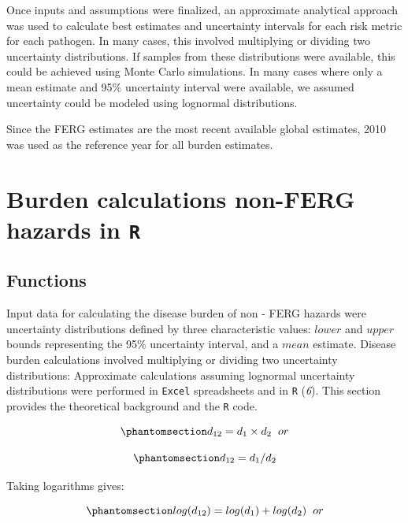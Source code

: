 \documentclass[
  letterpaper,
  DIV=11,
  numbers=noendperiod]{scrartcl}
\begin{document}
Once inputs and assumptions were finalized, an approximate analytical
approach was used to calculate best estimates and uncertainty intervals
for each risk metric for each pathogen. In many cases, this involved
multiplying or dividing two uncertainty distributions. If samples from
these distributions were available, this could be achieved using Monte
Carlo simulations. In many cases where only a mean estimate and 95\%
uncertainty interval were available, we assumed uncertainty could be
modeled using lognormal distributions.

Since the FERG estimates are the most recent available global estimates,
2010 was used as the reference year for all burden estimates.

\section{\texorpdfstring{Burden calculations non-FERG hazards in
\texttt{R}}{Burden calculations non-FERG hazards in R}}\label{burden-calculations-non-ferg-hazards-in-r}

\subsection{Functions}\label{functions}

Input data for calculating the disease burden of non - FERG hazards were
uncertainty distributions defined by three characteristic values:
\(lower\) and \(upper\) bounds representing the 95\% uncertainty
interval, and a \(mean\) estimate. Disease burden calculations involved
multiplying or dividing two uncertainty distributions: Approximate
calculations assuming lognormal uncertainty distributions were performed
in \texttt{Excel} spreadsheets and in \texttt{R} (\emph{6}). This
section provides the theoretical background and the \texttt{R} code.

\begin{equation}\phantomsection\label{eq-multiply}{
d_{12}=d_1 \times d_2 \hspace{.2 cm} or
}\end{equation}

\begin{equation}\phantomsection\label{eq-divide}{
d_{12}=d_1  /  d_2
}\end{equation}

Taking logarithms gives:

\begin{equation}\phantomsection\label{eq-logmultiply}{
log(d_{12})=log(d_1) + log(d_2) \hspace{.2 cm} or
}\end{equation}
\end{document}
